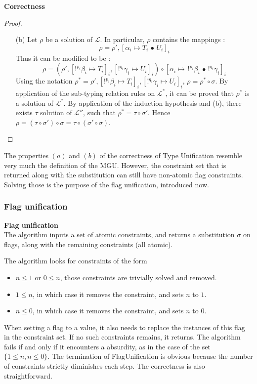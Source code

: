 \begin{thm}{\bf Correctness}
\begin{proof}
\begin{itemize}
\begin{itemize}
						\item[(b)] Let $\rho$ be a solution of $\mathcal{L}$. In particular, $\rho$ contains the mappings :
								$$\rho = \rho', [\alpha_i \mapsto T_i \,\bullet\, U_i]_i$$
							Thus it can be modified to be :
								$$\rho = (\rho',[!^{p_i}\beta_i \mapsto T_i]_i, [!^{q_i}\gamma_i \mapsto U_i]_i) \circ
									[\alpha_i \mapsto \,!^{p_i}\beta_i \,\bullet\, !^{q_i}\gamma_i]_i$$
							Using the notation $\rho^* = \rho' ,[!^{p_i}\beta_i \mapsto T_i]_i,[!^{q_i}\gamma_i \mapsto U_i]_i$,
							$\rho = \rho^* \circ \sigma$. By application of the sub-typing relation rules on $\mathcal{L}^*$, it can be proved
							that $\rho^*$ is a solution of $\mathcal{L}^*$. By application of the induction hypothesis and (b), there exists
							$\tau$ solution of $\mathcal{L''}$, such that $\rho^* = \tau \circ \sigma'$. Hence $\rho = (\tau \circ \sigma') \circ \sigma =
							\tau \circ (\sigma' \circ \sigma)$.
					\end{itemize}
		\end{itemize}
	\end{proof}
\end{thm}

\begin{remark} The properties $(a)$ and $(b)$ of the correctness of Type Unification resemble very much the definition of the MGU.
	However, the constraint set that is returned along with the substitution can still have non-atomic flag constraints.
	Solving those is the purpose of the flag unification, introduced now.
\end{remark}

\subsubsection{Flag unification}

\begin{defn}{\bf Flag unification} \\
	The algorithm inputs a set of atomic constraints, and returns a substitution $\sigma$ on flags, along with
	the remaining constraints (all atomic).
	
	The algorithm looks for constraints of the form
	\begin{itemize}
		\item $n \le 1$ or $0 \le n$, those constraints are trivially solved and removed.
		\item $1 \le n$, in which case it removes the constraint, and sets $n$ to $1$.
		\item $n \le 0$, in which case it removes the constraint, and sets $n$ to $0$.
	\end{itemize}	
	When setting a flag to a value, it also needs to replace the instances of this flag in the constraint set.
	If no such constraints remains, it returns. The algorithm fails if and only if it encounters a absurdity,
	as in the case of the set $\{ 1 \le n, n \le 0 \}$.
	The termination of FlagUnification is obvious because the number of constraints strictly diminishes each step.
	The correctness is also straightforward.
\end{defn}

